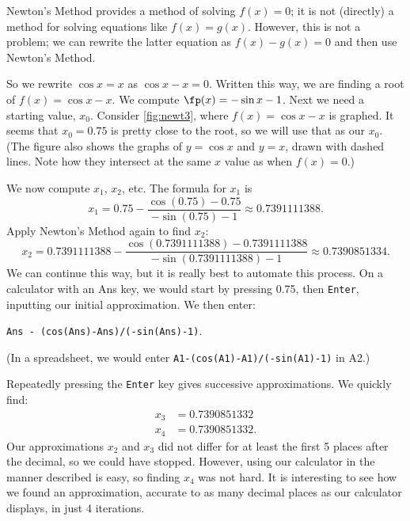 {Newton's Method provides a method of solving $f(x) = 0$; it is not (directly) a method for solving equations like $f(x) = g(x)$. However, this is not a problem; we can rewrite the latter equation as $f(x) - g(x)=0$ and then use Newton's Method. 

So we rewrite $\cos x=x$ as $\cos{x}-x=0$.  Written this way, we are finding a root of $f(x)=\cos{x}-x$.  We compute $\fp(x)=-\sin{x} - 1$.  Next we need a starting value, $x_0$.  Consider \autoref{fig:newt3}, where $f(x) = \cos x-x$ is graphed. It seems that $x_0=0.75$ is pretty close to the root, so we will use that as our $x_0$. (The figure also shows the graphs of $y=\cos x$ and $y=x$, drawn with dashed lines. Note how they intersect at the same $x$ value as when $f(x) = 0$.)


We now compute $x_1$, $x_2$, etc.  The formula for $x_1$ is 
$$x_1 = 0.75 - \frac{\cos(0.75)-0.75}{-\sin(0.75)-1}\approx 0.7391111388.$$
Apply Newton's Method again to find $x_2$:
$$x_2 = 0.7391111388 - \frac{\cos(0.7391111388)-0.7391111388}{-\sin(0.7391111388)-1}\approx 0.7390851334.$$
We can continue this way, but it is really best to automate this process.  On a calculator with an Ans key, we would start by pressing 0.75, then \texttt{Enter}, inputting our initial approximation. We then enter:
\begin{center}\texttt{Ans - (cos(Ans)-Ans)/(-sin(Ans)-1)}.\end{center}
(In a spreadsheet, we would enter \texttt{A1-(cos(A1)-A1)/(-sin(A1)-1)} in A2.)

Repeatedly pressing the \texttt{Enter} key gives successive approximations.  We quickly find:
\begin{align*}
x_3 &= 0.7390851332\\
x_4 &= 0.7390851332.
\end{align*}
Our approximations $x_2$ and $x_3$ did not differ for at least the first 5 places after the decimal, so we could have stopped. However, using our calculator in the manner described is easy, so finding $x_4$ was not hard. It is interesting to see how we found an approximation, accurate to as many decimal places as our calculator displays, in just 4 iterations.}

